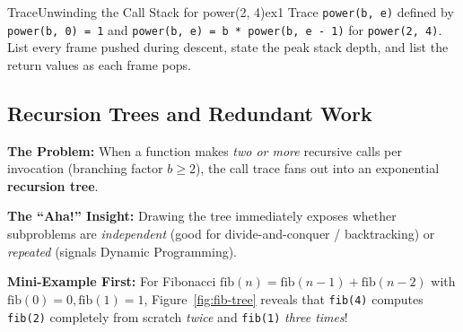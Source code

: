 \documentclass[11pt,a4paper]{article}
\theoremstyle{definition}
\newcommand{\painbeat}{\textbf{\color{accentamber}The Problem:} }
\newcommand{\ahabeat}{\textbf{\color{accentteal}The ``Aha!'' Insight:} }
\newcommand{\examplebeat}{\textbf{\color{primaryblue}Mini-Example First:} }
\begin{document}
\begin{tryitbox}{Trace}{Unwinding the Call Stack for power(2, 4)}{ex1}
Trace \texttt{power(b, e)} defined by \texttt{power(b, 0) = 1} and \texttt{power(b, e) = b * power(b, e - 1)} for \texttt{power(2, 4)}. List every frame pushed during descent, state the peak stack depth, and list the return values as each frame pops.
\end{tryitbox}

\subsection{Recursion Trees and Redundant Work}

\painbeat When a function makes \emph{two or more} recursive calls per invocation (branching factor $b \ge 2$), the call trace fans out into an exponential \textbf{recursion tree}.

\ahabeat Drawing the tree immediately exposes whether subproblems are \emph{independent} (good for divide-and-conquer / backtracking) or \emph{repeated} (signals Dynamic Programming).

\examplebeat For Fibonacci $\text{fib}(n) = \text{fib}(n-1) + \text{fib}(n-2)$ with $\text{fib}(0) = 0, \text{fib}(1) = 1$, Figure~\ref{fig:fib-tree} reveals that \texttt{fib(4)} computes \texttt{fib(2)} completely from scratch \emph{twice} and \texttt{fib(1)} \emph{three times}!
\end{document}
